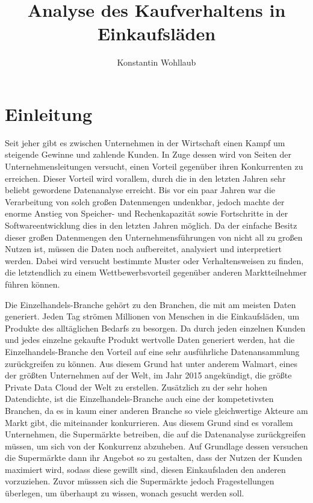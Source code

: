 \documentclass[usegeometry=true]{scrartcl}
\begin{document}
\subject{Projektbericht zum Modul Information Retrieval und Visualisierung Sommersemester 2022}
\title{Analyse des Kaufverhaltens in Einkaufsläden}
\author{Konstantin Wohllaub}%
\maketitle%
\newpage
\tableofcontents
\newpage
{}
\section{Einleitung}
Seit jeher gibt es zwischen Unternehmen in der Wirtschaft einen Kampf um steigende Gewinne und zahlende Kunden.
In Zuge dessen wird von Seiten der Unternehmensleitungen versucht, einen Vorteil gegenüber ihren Konkurrenten zu erreichen.
Dieser Vorteil wird vorallem, durch die in den letzten Jahren sehr beliebt gewordene Datenanalyse erreicht.
Bis vor ein paar Jahren war die Verarbeitung von solch großen Datenmengen undenkbar,
jedoch machte der enorme Anstieg von Speicher- und Rechenkapazität sowie Fortschritte in der Softwareentwicklung dies in den letzten Jahren möglich.\cite[1]{emrouznejad2016big}
Da der einfache Besitz dieser großen Datenmengen den Unternehmensführungen von nicht all zu großen Nutzen ist, müssen die Daten noch aufbereitet, analysiert und interpretiert werden.\cite[1]{Tien2013}
Dabei wird versucht bestimmte Muster oder Verhaltensweisen zu finden, die letztendlich zu einem Wettbewerbsvorteil gegenüber anderen Marktteilnehmer führen können.

\noindent Die Einzelhandels-Branche gehört zu den Branchen, die mit am meisten Daten generiert.
Jeden Tag strömen Millionen von Menschen in die Einkaufsläden, um Produkte des alltäglichen Bedarfs zu besorgen.
Da durch jeden einzelnen Kunden und jedes einzelne gekaufte Produkt wertvolle Daten generiert werden, hat die Einzelhandels-Branche den Vorteil auf eine sehr ausführliche
Datenansammlung zurückgreifen zu können.
Aus diesem Grund hat unter anderem Walmart, eines der größten Unternehmen auf der Welt, im Jahr 2015 angekündigt, die größte Private Data Cloud der Welt
zu erstellen.\cite[5]{marr2016big}
Zusätzlich zu der sehr hohen Datendichte, ist die Einzelhandels-Branche auch eine der kompetetivsten Branchen, da es in kaum einer anderen Branche
so viele gleichwertige Akteure am Markt gibt, die miteinander konkurrieren.\cite{Grewal2010}
Aus diesem Grund sind es vorallem Unternehmen, die Supermärkte betreiben, die auf die Datenanalyse zurückgreifen müssen, um sich von der Konkurrenz abzuheben.
Auf Grundlage dessen versuchen die Supermärkte dann ihr Angebot so zu gestalten, dass der Nutzen der Kunden maximiert wird, sodass diese gewillt sind, diesen Einkaufsladen den anderen vorzuziehen.\cite[6]{marr2016big}
Zuvor müsssen sich die Supermärkte jedoch Fragestellungen überlegen, um überhaupt zu wissen, wonach gesucht werden soll.
\end{document}
